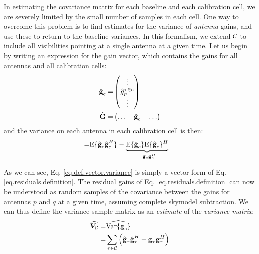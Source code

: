 \pg
In estimating the covariance matrix for each baseline and each calibration cell, we are severely limited by the small number of samples in each cell. One way to overcome this problem is to find estimates for the variance of \emph{antenna} gains, and use these to return to the baseline variances. In this formalism, we extend  $\mathcal{C}$ to include all visibilities pointing at a single antenna at a given time. Let us begin by writing an expression for the gain vector, which contains the gains for all antennas and all calibration cells:
\begin{align}
\hat{\textbf{g}}_c =& \begin{pmatrix} \vdots \\ \hat{g}_p^{\tau\in c} \\ \vdots \end{pmatrix}\\
\hat{\textbf{G}} =& \begin{pmatrix} \hdots \quad \hat{\textbf{g}}_c \quad \hdots \end{pmatrix}
\end{align}
and the variance on each antenna in each calibration cell is then:
\begin{align}
               =& \textrm{E}\{\hat{\textbf{g}}_c \hat{\textbf{g}}_c^H\} - \underbrace{\textrm{E}\{\hat{\textbf{g}}_c\} \textrm{E}\{\hat{\textbf{g}}_c\}^H}_{= \textbf{g}_c \textbf{g}_c^H} \label{eq.def.vector.variance}
\end{align}

\pg
As we can see, Eq. \ref{eq.def.vector.variance} is simply a vector form of Eq. \ref{eq.residuals.definition}.
The residual gains of Eq. \ref{eq.residuals.definition} can now be understood as random samples of the covariance between the gains for antennas $p$ and $q$ at a given time, assuming complete skymodel subtraction. We can thus define the variance sample matrix as an \emph{estimate} of the \emph{variance matrix}:
\begin{align}
\widehat{\bm{V}_{\mathcal{C}}} =&\widehat{\textrm{Var}\{\textbf{g}_c\}} \\
                   =& \sum_{\tau\in\mathcal{C}} \left( \hat{\textbf{g}}_\tau\hat{\textbf{g}}_\tau^H - \textbf{g}_\tau\textbf{g}_\tau^H \right)
\end{align}


